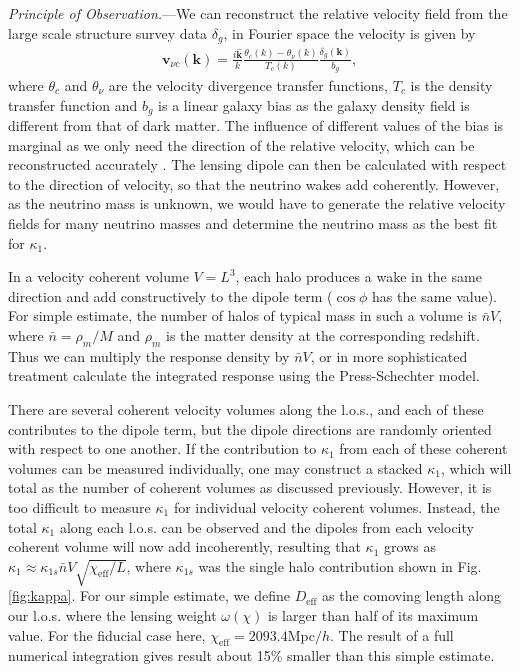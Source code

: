 \documentclass[aps,prl,twocolumn,showpacs,superscriptaddress,groupedaddress,nofootinbib]{revtex4}  %
\newcommand{\mr}{\mathrm}
\begin{document}
{\it Principle of Observation.}---We can reconstruct the relative 
velocity field from the large scale structure 
survey data  $\delta_g$, in Fourier space the velocity is given by
\begin{eqnarray}
\bm{v}_{\nu c} (\bm{k})= \frac{i\hat{\bm{k}}}{k}\frac{\theta_c(k) -
\theta_\nu(k)}{T_c(k)}\frac{\delta_g(\bm{k})}{b_g},
\label{eqn:flinvel}
\end{eqnarray}
where $\theta_c$ and $\theta_\nu$ are the velocity divergence 
transfer functions, $T_c$ is
the density transfer function and $b_g$ is a linear galaxy bias as 
the galaxy density field is different from that of dark matter. 
The influence of different values of the bias is marginal as we only need
the direction of the relative velocity, which can be reconstructed accurately
\cite{2015PhRvD..92b3502I}.
The lensing dipole can then be calculated with respect to the direction of velocity, so that 
the neutrino wakes add coherently. However, as the neutrino mass is unknown,
we would have to generate the relative velocity fields for many
neutrino masses and determine the neutrino mass as the best fit for
$\kappa_1$. 

In a velocity coherent volume $V=L^3$, each halo produces a wake in
the same direction and add constructively to the dipole term
($\cos\phi$ has the same value).  For simple estimate, the number of
halos of typical mass in such a volume is $\bar{n} V$, where
$\bar{n}=\rho_m/M$ and $\rho_m$ is the matter density at the
corresponding redshift. 
Thus we can multiply the response density by $\bar{n} V$, or
in more sophisticated treatment calculate the integrated response using the 
Press-Schechter model.

There are several coherent velocity volumes along the l.o.s., and 
each of these contributes to the dipole term, but the dipole directions are
randomly oriented with
respect to one another. If the contribution to $\kappa_1$ from each of
these coherent volumes can be measured individually, one may construct
a stacked $\kappa_1$, which will total as the number of coherent volumes
as discussed previously.  
However, it is too difficult to measure $\kappa_1$
for individual velocity coherent volumes. Instead, the total
$\kappa_1$ along each l.o.s. can be observed and the dipoles from
each velocity coherent volume will now add incoherently, resulting that 
$\kappa_1$ grows as $\kappa_1\approx\kappa_{1s}\bar{n}V\sqrt{\chi_\mr{eff}/L}$,
where
$\kappa_{1s}$ was the single halo contribution shown in Fig. \ref{fig:kappa}. For our simple estimate,
we define $D_\mr{eff}$ as the comoving length along our l.o.s. where the lensing
weight $\omega(\chi)$ is larger than half of its maximum
value. For the fiducial case here, $\chi_\mr{eff}=2093.4$Mpc$/h$. The result of a full
numerical integration gives result about 15\% smaller than this simple estimate.
\end{document}

